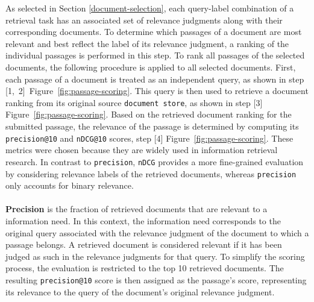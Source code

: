 As selected in Section \ref{document-selection}, each query-label combination of a retrieval task has an associated set of relevance judgments along with their corresponding documents. To determine which passages of a document are most relevant and best reflect the label of its relevance judgment, a ranking of the individual passages is performed in this step. To rank all passages of the selected documents, the following procedure is applied to all selected documents. First, each passage of a document is treated as an independent query, as shown in step \mbox{[1, 2] Figure~\ref{fig:passage-scoring}}. This query is then used to retrieve a document ranking from its original source \texttt{document store}, as shown in step [3] Figure~\ref{fig:passage-scoring}. Based on the retrieved document ranking for the submitted passage, the relevance of the passage is determined by computing its \texttt{precision@10} and \texttt{nDCG@10} scores, step [4] Figure~\ref{fig:passage-scoring}. These metrics were chosen because they are widely used in information retrieval research. In contrast to \texttt{precision}, \texttt{nDCG} provides a more fine-grained evaluation by considering relevance labels of the retrieved documents, whereas \texttt{precision} only accounts for binary relevance.
\\\\
\textbf{Precision} is the fraction of retrieved documents that are relevant to a information need. In this context, the information need corresponds to the original query associated with the relevance judgment of the document to which a passage belongs. A retrieved document is considered relevant if it has been judged as such in the relevance judgments for that query. To simplify the scoring process, the evaluation is restricted to the top 10 retrieved documents. The resulting \texttt{precision@10} score is then assigned as the passage's score, representing its relevance to the query of the document's original relevance judgment.
\\\\
